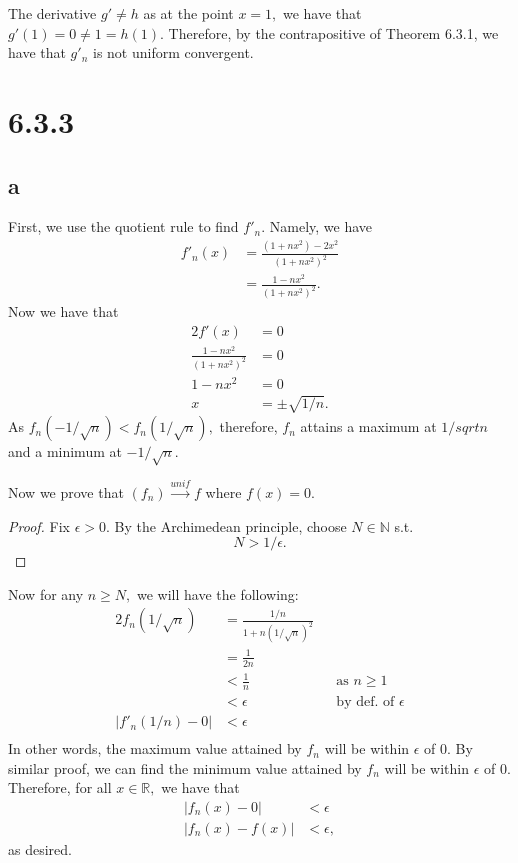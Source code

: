 \documentclass[10pt]{article}
\begin{document}
The derivative $g'\neq h$ as at the point $x=1,$ we have that $g'(1)=0\neq 1 = h(1).$ Therefore, by the contrapositive of Theorem 6.3.1, we have that $g'_n$ is not uniform convergent.

\section*{6.3.3}

\subsection*{a}

First, we use the quotient rule to find $f'_n$. Namely, we have
\begin{align*}
    f'_n(x) &= \frac{(1+nx^2)-2x^2}{(1+nx^2)^2}\\
    &= \frac{1-nx^2}{(1+nx^2)^2}.
\end{align*}
Now we have that
\begin{alignat*}{2}
    f'(x)&= 0\\
    \frac{1-nx^2}{(1+nx^2)^2} &= 0\\
    1-nx^2 &= 0\\
    x &= \pm\sqrt{1/n}.
\end{alignat*}
As $f_n(-1/\sqrt{n})<f_n(1/\sqrt{n}),$ therefore, $f_n$ attains a maximum at $1/sqrt{n}$ and a minimum at $-1/\sqrt{n}.$

Now we prove that $(f_n)\stackrel{unif}{\to}f$ where $f(x)=0.$
\begin{proof}
    Fix $\epsilon > 0.$ By the Archimedean principle, choose $N\in\mathbb{N}$ s.t.
    \[N>1/\epsilon.\]
\end{proof}
Now for any $n\ge N,$ we will have the following:
\begin{alignat*}{2}
    f_n(1/\sqrt{n}) &= \frac{1/n}{1+n(1/\sqrt{n})^2}\\
    &= \frac{1}{2n}\\
    &< \frac{1}{n} &&\text{as $n\ge 1$}\\
    &<\epsilon \quad&&\text{by def. of }\epsilon\\
    |f'_n(1/n)-0|&<\epsilon\\
\end{alignat*}
In other words, the maximum value attained by $f_n$ will be within $\epsilon$ of $0.$ By similar proof, we can find the minimum value attained by $f_n$ will be within $\epsilon$ of $0.$ Therefore, for all $x\in\mathbb{R},$ we have that
\begin{align*}
    |f_n(x)-0| &<\epsilon\\
    |f_n(x)-f(x)|&<\epsilon,
\end{align*}
as desired.
\end{document}
